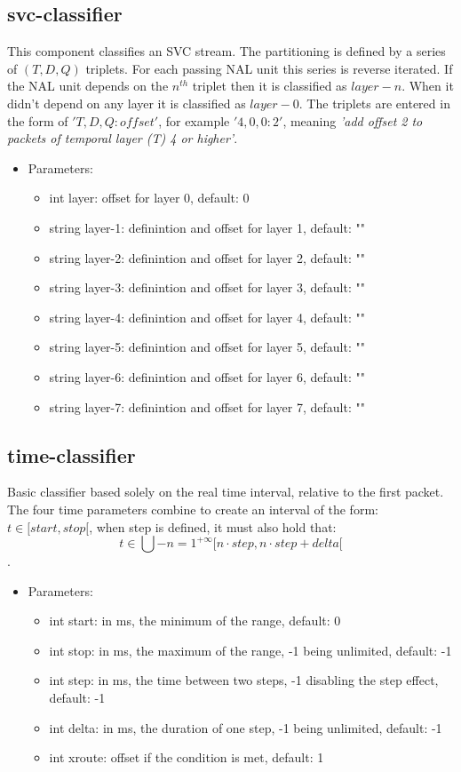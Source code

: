 \subsection{svc-classifier}
This component classifies an SVC stream. The partitioning is defined by a series of $(T,D,Q)$ triplets. For each passing NAL unit this series is reverse iterated. If the NAL unit depends on the $n^{th}$ triplet then it is classified as $layer-{n}$. When it didn't depend on any layer it is classified as $layer-{0}$. The triplets are entered in the form of $'T,D,Q:offset'$, for example $'4,0,0:2'$, meaning \textit{'add offset 2 to packets of temporal layer (T) 4 or higher'}.
\begin{itemize}
\item Parameters:
\begin{itemize}
\item int layer: offset for layer 0, default: 0
\item string layer-1: definintion and offset for layer 1, default: ""
\item string layer-2: definintion and offset for layer 2, default: ""
\item string layer-3: definintion and offset for layer 3, default: ""
\item string layer-4: definintion and offset for layer 4, default: ""
\item string layer-5: definintion and offset for layer 5, default: ""
\item string layer-6: definintion and offset for layer 6, default: ""
\item string layer-7: definintion and offset for layer 7, default: ""
\end{itemize}
\end{itemize}
\subsection{time-classifier}
Basic classifier based solely on the real time interval, relative to the first packet. The four time parameters combine to create an interval of the form: $t\in[start,stop[$, when step is defined, it must also hold that: $$t\in\bigcup-{n=1}^{+\infty}[n\cdot step,n\cdot step+delta[$$.
\begin{itemize}
\item Parameters:
\begin{itemize}
\item int start: in ms, the minimum of the range, default: 0
\item int stop: in ms, the maximum of the range, -1 being unlimited, default: -1
\item int step: in ms, the time between two steps, -1 disabling the step effect, default: -1
\item int delta: in ms, the duration of one step, -1 being unlimited, default: -1
\item int xroute: offset if the condition is met, default: 1
\end{itemize}
\end{itemize}
